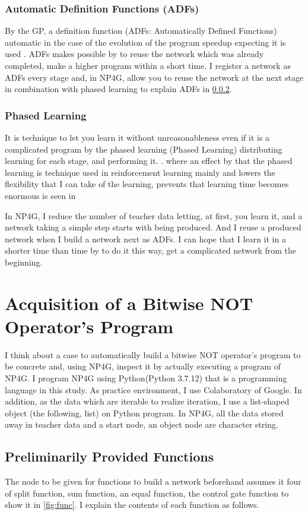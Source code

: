 \documentclass{article}
\begin{document}
\subsubsection {Automatic Definition Functions (ADFs)}
By the GP, a definition function (ADFs: Automatically Defined Functions) automatic in the case of the evolution of the program speedup expecting it is used \cite{adfs}.
ADFs makes possible by to reuse the network which was already completed, make a higher program within a short time.
I register a network as ADFs every stage and, in NP4G, allow you to reuse the network at the next stage in combination with phased learning to explain ADFs in \ref{sec:PL}.

\subsubsection {Phased Learning}
\label{sec:PL}
It is technique to let you learn it without unreasonableness even if it is a complicated program by the phased learning (Phased Learning) distributing learning for each stage, and performing it.
\cite{hodohara2012reinforcement}. where an effect by that the phased learning is technique used in reinforcement learning mainly and lowers the flexibility that I can take of the learning, prevents that learning time becomes enormous is seen in

In NP4G, I reduce the number of teacher data letting, at first, you learn it, and a network taking a simple step starts with being produced.
And I reuse a produced network when I build a network next as ADFs.
I can hope that I learn it in a shorter time than time by to do it this way, get a complicated network from the beginning.

\section {Acquisition of a Bitwise NOT Operator's Program}
I think about a case to automatically build a bitwise NOT operator's program to be concrete and, using NP4G, inspect it by actually executing a program of NP4G.
I program NP4G using Python(Python 3.7.12) that is a programming language in this study.
As practice environment, I use Colaboratory of Google.
In addition, as the data which are iterable to realize iteration, I use a list-shaped object (the following, list) on Python program.
In NP4G, all the data stored away in teacher data and a start node, an object node are character string.

\subsection {Preliminarily Provided Functions}
The node to be given for functions to build a network beforehand assumes it four of split function, sum function, an equal function, the control gate function to show it in \ref{fig:func}.
I explain the contents of each function as follows.
\end{document}
